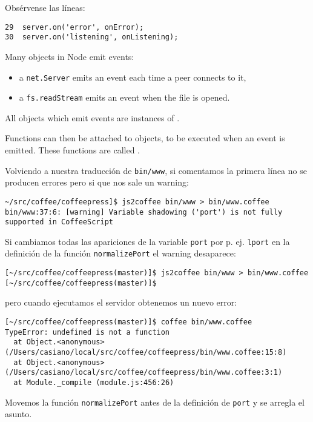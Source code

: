 Obsérvense las líneas:
\begin{verbatim}
29  server.on('error', onError);
30  server.on('listening', onListening);
\end{verbatim}

Many objects in Node emit events: 
\begin{itemize}
\item
a \verb|net.Server| emits an event each time a peer connects to it, 
\item
a \verb|fs.readStream| emits an event when the file is opened. 
\end{itemize}
All objects which emit events are instances of 
.

Functions can then be attached to objects, to be executed when an event is
emitted. These functions are called . 


Volviendo a nuestra traducción de \verb|bin/www|, 
si comentamos la primera línea no se producen errores pero si 
que nos sale un warning:
\begin{verbatim}
~/src/coffee/coffeepress]$ js2coffee bin/www > bin/www.coffee
bin/www:37:6: [warning] Variable shadowing ('port') is not fully supported in CoffeeScript
\end{verbatim}
Si cambiamos todas las apariciones de la variable 
\verb|port|  por p. ej. \verb|lport|
en la definición de la función \verb|normalizePort| el warning desaparece:
\begin{verbatim}
[~/src/coffee/coffeepress(master)]$ js2coffee bin/www > bin/www.coffee 
[~/src/coffee/coffeepress(master)]$ 
\end{verbatim}
pero cuando ejecutamos el servidor obtenemos un nuevo error:
\begin{verbatim}
[~/src/coffee/coffeepress(master)]$ coffee bin/www.coffee 
TypeError: undefined is not a function
  at Object.<anonymous> (/Users/casiano/local/src/coffee/coffeepress/bin/www.coffee:15:8)
  at Object.<anonymous> (/Users/casiano/local/src/coffee/coffeepress/bin/www.coffee:3:1)
  at Module._compile (module.js:456:26)
\end{verbatim}

Movemos la función \verb|normalizePort| antes de la definición de \verb|port| y se arregla el asunto.


